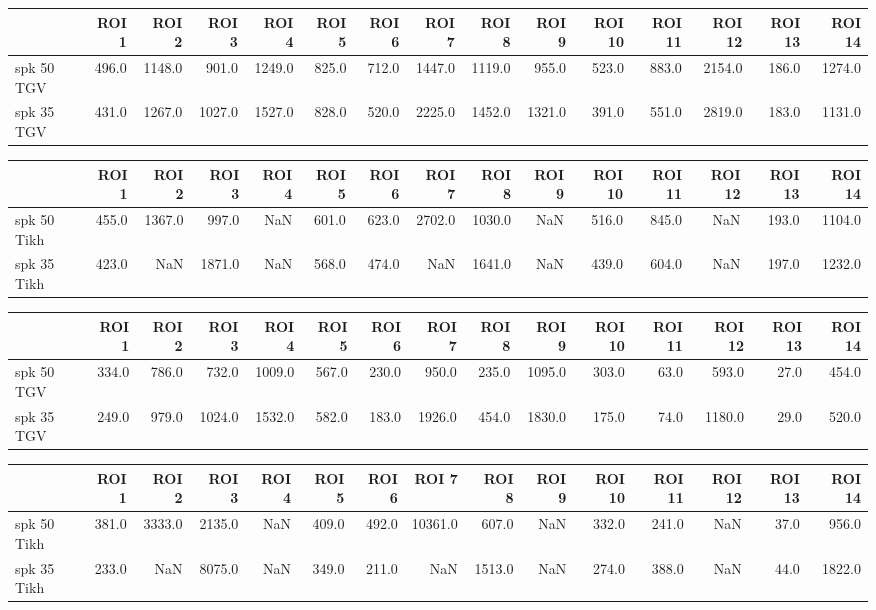 \begin{tabular}{lrrrrrrrrrrrrrr}
\toprule
{} &  ROI 1 &   ROI 2 &   ROI 3 &   ROI 4 &  ROI 5 &  ROI 6 &   ROI 7 &   ROI 8 &   ROI 9 &  ROI 10 &  ROI 11 &  ROI 12 &  ROI 13 &  ROI 14 \\
\midrule
 spk 50 TGV &  496.0 &  1148.0 &   901.0 &  1249.0 &  825.0 &  712.0 &  1447.0 &  1119.0 &   955.0 &   523.0 &   883.0 &  2154.0 &   186.0 &  1274.0 \\
 spk 35 TGV &  431.0 &  1267.0 &  1027.0 &  1527.0 &  828.0 &  520.0 &  2225.0 &  1452.0 &  1321.0 &   391.0 &   551.0 &  2819.0 &   183.0 &  1131.0 \\
\bottomrule
\end{tabular}
\begin{tabular}{lrrrrrrrrrrrrrr}
\toprule
{} &  ROI 1 &   ROI 2 &   ROI 3 &  ROI 4 &  ROI 5 &  ROI 6 &   ROI 7 &   ROI 8 &  ROI 9 &  ROI 10 &  ROI 11 &  ROI 12 &  ROI 13 &  ROI 14 \\
\midrule
 spk 50 Tikh &  455.0 &  1367.0 &   997.0 &    NaN &  601.0 &  623.0 &  2702.0 &  1030.0 &    NaN &   516.0 &   845.0 &     NaN &   193.0 &  1104.0 \\
 spk 35 Tikh &  423.0 &     NaN &  1871.0 &    NaN &  568.0 &  474.0 &     NaN &  1641.0 &    NaN &   439.0 &   604.0 &     NaN &   197.0 &  1232.0 \\
\bottomrule
\end{tabular}
\begin{tabular}{lrrrrrrrrrrrrrr}
\toprule
{} &  ROI 1 &  ROI 2 &   ROI 3 &   ROI 4 &  ROI 5 &  ROI 6 &   ROI 7 &  ROI 8 &   ROI 9 &  ROI 10 &  ROI 11 &  ROI 12 &  ROI 13 &  ROI 14 \\
\midrule
 spk 50 TGV &  334.0 &  786.0 &   732.0 &  1009.0 &  567.0 &  230.0 &   950.0 &  235.0 &  1095.0 &   303.0 &    63.0 &   593.0 &    27.0 &   454.0 \\
 spk 35 TGV &  249.0 &  979.0 &  1024.0 &  1532.0 &  582.0 &  183.0 &  1926.0 &  454.0 &  1830.0 &   175.0 &    74.0 &  1180.0 &    29.0 &   520.0 \\
\bottomrule
\end{tabular}
\begin{tabular}{lrrrrrrrrrrrrrr}
\toprule
{} &  ROI 1 &   ROI 2 &   ROI 3 &  ROI 4 &  ROI 5 &  ROI 6 &    ROI 7 &   ROI 8 &  ROI 9 &  ROI 10 &  ROI 11 &  ROI 12 &  ROI 13 &  ROI 14 \\
\midrule
 spk 50 Tikh &  381.0 &  3333.0 &  2135.0 &    NaN &  409.0 &  492.0 &  10361.0 &   607.0 &    NaN &   332.0 &   241.0 &     NaN &    37.0 &   956.0 \\
 spk 35 Tikh &  233.0 &     NaN &  8075.0 &    NaN &  349.0 &  211.0 &      NaN &  1513.0 &    NaN &   274.0 &   388.0 &     NaN &    44.0 &  1822.0 \\
\bottomrule
\end{tabular}
